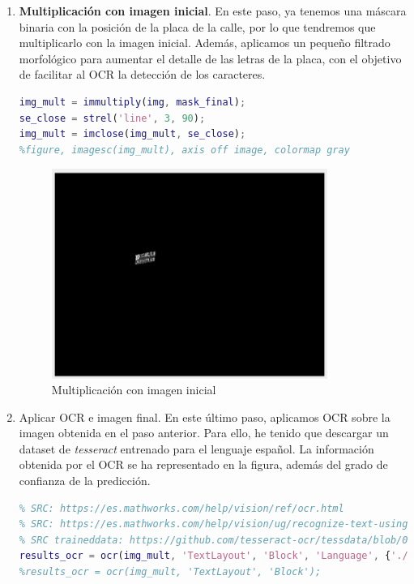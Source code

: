 \documentclass[12pt]{article}
\begin{document}
\begin{enumerate}
		\pagebreak
		
		\item \textbf{Multiplicación con imagen inicial}. En este paso, ya tenemos una máscara binaria con la posición de la placa de la calle, por lo que tendremos que multiplicarlo con la imagen inicial. Además, aplicamos un pequeño filtrado morfológico para aumentar el detalle de las letras de la placa, con el objetivo de facilitar al OCR la detección de los caracteres.
		\begin{lstlisting}[language=matlab, caption={Multiplicación con imagen inicial}]
% Multiplicar
img_mult = immultiply(img, mask_final);
se_close = strel('line', 3, 90);
img_mult = imclose(img_mult, se_close);
%figure, imagesc(img_mult), axis off image, colormap gray
		\end{lstlisting}
	
		\begin{figure}[h!]
			\begin{center}
				\includegraphics[width=0.85\textwidth]{img/impl_7.png}
				\caption{Multiplicación con imagen inicial}
				\label{img: multiplicacion}
			\end{center}
		\end{figure}
	
		\pagebreak
		
		\item Aplicar OCR e imagen final. En este último paso, aplicamos OCR sobre la imagen obtenida en el paso anterior. Para ello, he tenido que descargar un dataset de \textit{tesseract} entrenado para el lenguaje español. La información obtenida por el OCR se ha representado en la figura, además del grado de confianza de la predicción. 
		\begin{lstlisting}[language=matlab, caption={Aplicar OCR e imagen final}]
% OCR
% SRC: https://es.mathworks.com/help/vision/ref/ocr.html
% SRC: https://es.mathworks.com/help/vision/ug/recognize-text-using-optical-character-recognition-ocr.html
% SRC traineddata: https://github.com/tesseract-ocr/tessdata/blob/074c37215b01ab8cc47a0e06ff7356383883d775/spa.traineddata
results_ocr = ocr(img_mult, 'TextLayout', 'Block', 'Language', {'./tessdata/spa_old_2015.traineddata'});
%results_ocr = ocr(img_mult, 'TextLayout', 'Block');


\end{lstlisting}
\end{enumerate}
\end{document}
